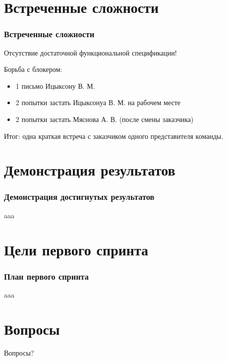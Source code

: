 \documentclass{beamer}
\begin{document}
\section{Встреченные сложности}

\begin{frame}
\frametitle{Встреченные сложности}

Отсутствие достаточной функциональной спецификации!
\bigskip

Борьба с блокером:
\begin{itemize}
\item 1 письмо Ицыксону В. М.
\item 2 попытки застать Ицыксонуа В. М. на рабочем месте
\item 2 попытки застать Мяснова А. В. (после смены заказчика)
\end{itemize}
\bigskip

Итог: одна краткая встреча с заказчиком одного представителя команды.

\end{frame}


\section{Демонстрация результатов}

\begin{frame}
\frametitle{Демонстрация достигнутых результатов}

aaa

\end{frame}

\section{Цели первого спринта}

\begin{frame}
\frametitle{План первого спринта}

aaa

\end{frame}

\section{Вопросы}

\begin{frame}
\Huge{\centerline{Вопросы?}}
\end{frame}

\end{document}
